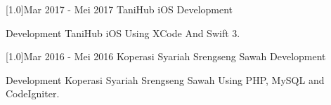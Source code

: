 \documentclass[english]{cv-style}
\begin{document}
\begin{entrylist}
{\begin{itemize}
  \end{itemize}}
\entry
{\scalebox{.6}[1.0]{Mar 2017 - Mei 2017}}
{TaniHub iOS Development}
{}
{\vspace{-0.3cm}
  \begin{itemize}\small{
    \item Development TaniHub iOS Using XCode And Swift 3.}
  \end{itemize}}
\entry
{\scalebox{.6}[1.0]{Mar 2016 - Mei 2016}}
{Koperasi Syariah Srengseng Sawah Development}
{}
{\vspace{-0.3cm}
  \begin{itemize}\small{
    \item Development Koperasi Syariah Srengseng Sawah Using PHP, MySQL and CodeIgniter.}
  \end{itemize}}
\end{entrylist}
\end{document}
